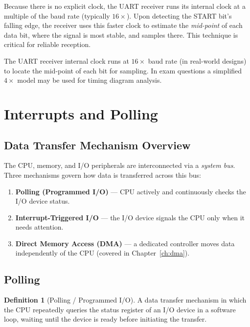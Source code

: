 \documentclass[11pt, a4paper, notitlepage]{report}
\theoremstyle{definition}
\newtheorem{definition}[theorem]{Definition}
\theoremstyle{remark}
\theoremstyle{definition}
\begin{document}
Because there is no explicit clock, the UART receiver runs its internal clock at a multiple of the baud rate (typically $16\times$). Upon detecting the START bit's falling edge, the receiver uses this faster clock to estimate the \emph{mid-point} of each data bit, where the signal is most stable, and samples there. This technique is critical for reliable reception.

\begin{examtip}[title={Exam Tip: UART Receiver Internal Clock}]
  The UART receiver internal clock runs at $16\times$ baud rate (in real-world designs) to locate the mid-point of each bit for sampling. In exam questions a simplified $4\times$ model may be used for timing diagram analysis.
\end{examtip}

\section{Interrupts and Polling}
\label{ch:interrupts}

\subsection{Data Transfer Mechanism Overview}
\label{sec:dtm-overview}

The CPU, memory, and I/O peripherals are interconnected via a \emph{system bus}. Three mechanisms govern how data is transferred across this bus:

\begin{enumerate}
  \item \textbf{Polling (Programmed I/O)} — CPU actively and continuously checks the I/O device status.
  \item \textbf{Interrupt-Triggered I/O} — the I/O device signals the CPU only when it needs attention.
  \item \textbf{Direct Memory Access (DMA)} — a dedicated controller moves data independently of the CPU (covered in Chapter~\ref{ch:dma}).
\end{enumerate}

\subsection{Polling}
\label{sec:polling}

\begin{definition}[Polling / Programmed I/O]
  \label{def:polling}
  A data transfer mechanism in which the CPU repeatedly queries the status register of an I/O device in a software loop, waiting until the device is ready before initiating the transfer.
\end{definition}
\end{document}
